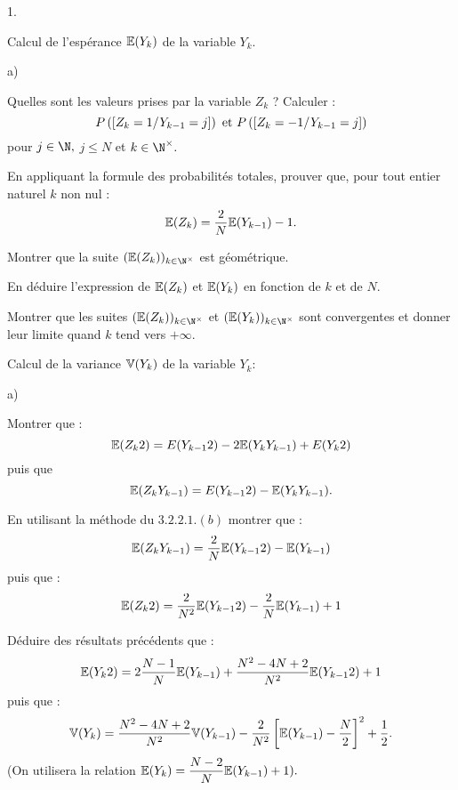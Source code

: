 \documentclass[11pt]{article}%
\begin{document}
\begin{noliste}{1.}
 \setlength{\itemsep}{4mm}
\item Calcul de l'espérance $\mathbb{E}(Y_{k})$ de la variable $Y_{k}.$

\begin{noliste}{a)}
 \setlength{\itemsep}{2mm}
\item Quelles sont les valeurs prises par la variable $Z_{k}$ ?
Calculer :
\[
P\left(\left[ {Z_{k} = 1/Y_{k-1} = j} \right]\right)\text{ et }P\left(\left[ {Z_{k} =
-1/Y_{k-1} = j} \right]\right)
\]
pour $j\in \N,$ $j\leq N$ et $k\in \N^{\times }.$

\item En appliquant la formule des probabilités totales, prouver que,
pour
tout entier naturel $k$ non nul :
\[
\mathbb{E}(Z_{k}) = \dfrac{2}{N}\mathbb{E}(Y_{k-1})-1.
\]

\item Montrer que la suite $(\E(Z_{k}))_{k\in \N^{\times }}$ est
géométrique.

\item En déduire l'expression de $\mathbb{E}(Z_{k})$ et $\mathbb{E}(Y_{k})$ en fonction
de $k$
et de $N.$

\item Montrer que les suites $(\E(Z_{k}))_{k\in \N^{\times }}$ et
$(\E(Y_{k}))_{k\in \N^{\times }}$ sont convergentes et donner leur
limite quand $k$ tend vers $ + \infty.$
\end{noliste}

\item Calcul de la variance $\mathbb{V}(Y_{k})$ de la variable $Y_{k} :$

\begin{noliste}{a)}
 \setlength{\itemsep}{2mm}
\item Montrer que :
\[
\mathbb{E}(Z_{k}{2}) = E(Y_{k-1}{2})-2\mathbb{E}(Y_{k}Y_{k-1}) + E(Y_{k}{2})
\]
puis que 
\[
\mathbb{E}(Z_{k}Y_{k-1}) = E(Y_{k-1}{2})-\mathbb{E}(Y_{k}Y_{k-1}).
\]

\item En utilisant la méthode du $3.2.2.1.(b)$ montrer que :
\[
\mathbb{E}(Z_{k}Y_{k-1}) = \dfrac{2}{N}\mathbb{E}(Y_{k-1}{2})-\mathbb{E}(Y_{k-1})
\]
puis que :
\[
\mathbb{E}(Z_{k}{2}) = \dfrac{2}{N^{2}}\mathbb{E}(Y_{k-1}{2})-\dfrac{2}{N}\mathbb{E}(Y_{k-1}) +
1
\]

\item Déduire des résultats précédents que :
\[
\mathbb{E}(Y_{k}{2}) = 2\dfrac{N-1}{N}\mathbb{E}(Y_{k-1}) + \dfrac{N^{2}-4N +
2}{N^{2}}\mathbb{E}(Y_{k-1}{2}) + 1
\]
puis que :
\[
\mathbb{V}(Y_{k}) = \dfrac{N^{2}-4N +
2}{N^{2}}\mathbb{V}(Y_{k-1})-\dfrac{2}{N^{2}}\left[
\mathbb{E}(Y_{k-1})-\dfrac{N}{2}\right] ^{2} + \dfrac{1}{2}.
\]
(On utilisera la relation $\mathbb{E}(Y_{k}) = \dfrac{N-2}{N}\mathbb{E}(Y_{k-1}) + 1).$


\end{noliste}
\end{noliste}
\end{document}
